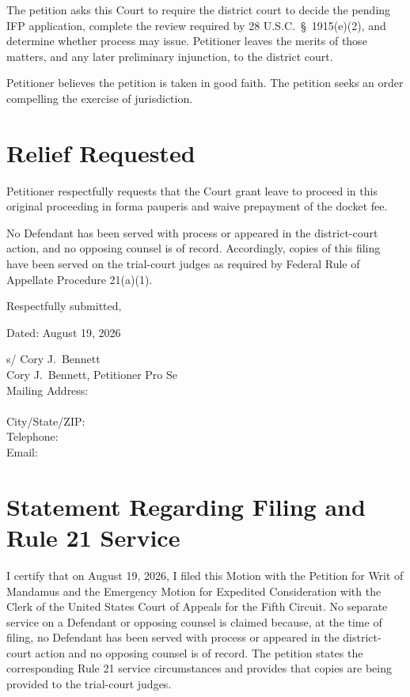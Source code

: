 \documentclass[14pt]{extarticle}
\renewcommand{\FilingDate}{August 19, 2026}
\begin{document}
The petition asks this Court to require the district court to decide the pending IFP application, complete the review required by 28 U.S.C.\ \S\ 1915(e)(2), and determine whether process may issue. Petitioner leaves the merits of those matters, and any later preliminary injunction, to the district court.

\clearpage
Petitioner believes the petition is taken in good faith. The petition seeks an order compelling the exercise of jurisdiction.

\section*{Relief Requested}

Petitioner respectfully requests that the Court grant leave to proceed in this original proceeding in forma pauperis and waive prepayment of the docket fee.

No Defendant has been served with process or appeared in the district-court action, and no opposing counsel is of record. Accordingly, copies of this filing have been served on the trial-court judges as required by Federal Rule of Appellate Procedure 21(a)(1).

\singlespacing
\vspace{0.55em}
\noindent Respectfully submitted,

\vspace{0.15em}
\noindent Dated: \FilingDate

\vspace{0.15em}
\noindent s/ Cory J.\ Bennett\\
Cory J.\ Bennett, Petitioner Pro Se\\
Mailing Address: \FilingPlaintiffMailingLineOne\\
\phantom{Mailing Address: }\FilingPlaintiffMailingLineTwo\\
City/State/ZIP: \FilingPlaintiffMailingCityStateZip\\
Telephone: \FilingPlaintiffTelephone\\
Email: \FilingPlaintiffEmail

\clearpage
\section*{Statement Regarding Filing and Rule 21 Service}

I certify that on \FilingDate, I filed this Motion with the Petition for Writ of Mandamus and the Emergency Motion for Expedited Consideration with the Clerk of the United States Court of Appeals for the Fifth Circuit. No separate service on a Defendant or opposing counsel is claimed because, at the time of filing, no Defendant has been served with process or appeared in the district-court action and no opposing counsel is of record. The petition states the corresponding Rule 21 service circumstances and provides that copies are being provided to the trial-court judges.
\end{document}
